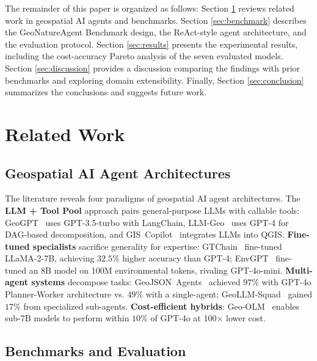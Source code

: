 \documentclass[sigconf]{acmart}
\begin{document}
The remainder of this paper is organized as follows: Section \ref{sec:related} reviews related work in geospatial AI agents and benchmarks. Section \ref{sec:benchmark} describes the GeoNatureAgent Benchmark design, the ReAct-style agent architecture, and the evaluation protocol. Section \ref{sec:results} presents the experimental results, including the cost-accuracy Pareto analysis of the seven evaluated models. Section \ref{sec:discussion} provides a discussion comparing the findings with prior benchmarks and exploring domain extensibility. Finally, Section \ref{sec:conclusion} summarizes the conclusions and suggests future work.



\section{Related Work}
\label{sec:related}


\subsection{Geospatial AI Agent Architectures}

The literature reveals four paradigms of geospatial AI agent architectures. The \textbf{LLM + Tool Pool} approach pairs general-purpose LLMs with callable tools: GeoGPT~\citep{zhang2023geogpt} uses GPT-3.5-turbo with LangChain, LLM-Geo~\citep{li2023llmgeo} uses GPT-4 for DAG-based decomposition, and GIS~Copilot~\citep{akinboyewa2024giscopilot} integrates LLMs into QGIS. \textbf{Fine-tuned specialists} sacrifice generality for expertise: GTChain~\citep{zhang2024gtchain} fine-tuned LLaMA-2-7B, achieving $32.5\%$ higher accuracy than GPT-4; EnvGPT~\citep{zhang2025envgpt} fine-tuned an 8B model on 100M environmental tokens, rivaling GPT-4o-mini. \textbf{Multi-agent systems} decompose tasks: GeoJSON~Agents~\citep{luo2025geojsonagents} achieved $97\%$ with GPT-4o Planner-Worker architecture vs. $49\%$ with a single-agent; GeoLLM-Squad~\citep{lee2025geollmsquad} gained $17\%$ from specialized sub-agents. \textbf{Cost-efficient hybrids}: Geo-OLM~\citep{stamoulis2025geoolm} enables sub-7B models to perform within $10\%$ of GPT-4o at 100$\times$ lower cost.


\subsection{Benchmarks and Evaluation}
\end{document}

